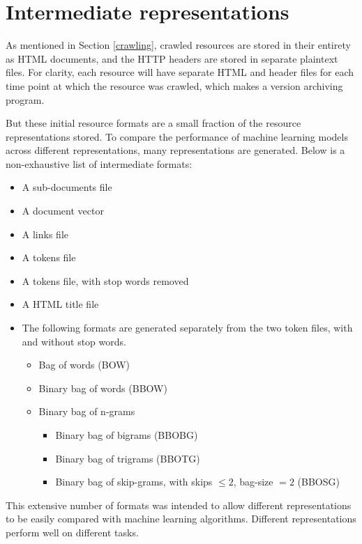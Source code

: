 \section{Intermediate representations\label{repr}}
As mentioned in Section \ref{crawling}, crawled resources are stored
in their entirety as HTML documents, and the HTTP headers are
stored in separate plaintext files.  For clarity, each
resource will have separate HTML and header files for each
time point at which the resource was crawled, which makes
\nr{} a version archiving program.

But these initial resource formats are a small fraction of the
resource representations stored.  To compare the performance of
machine learning models across different representations,
many representations are generated. Below is a non-exhaustive
list of intermediate formats:
\begin{itemize}
    \item A sub-documents file
    \item A document vector
    \item A links file
    \item A tokens file
    \item A tokens file, with stop words removed
    \item A HTML title file
    \item The following formats are generated separately from the
          two token files, with and without stop words.
    \begin{itemize}
        \item Bag of words (BOW)
        \item Binary bag of words (BBOW)
        \item Binary bag of n-grams
        \begin{itemize}
            \item Binary bag of bigrams (BBOBG)
            \item Binary bag of trigrams (BBOTG)
            \item Binary bag of skip-grams, with skips
                  $\le 2$, bag-size $= 2$ (BBOSG)
        \end{itemize}
    \end{itemize}
\end{itemize}
This extensive number of formats was intended to allow different
representations to be easily compared with machine learning algorithms.
Different representations perform well on different tasks.

